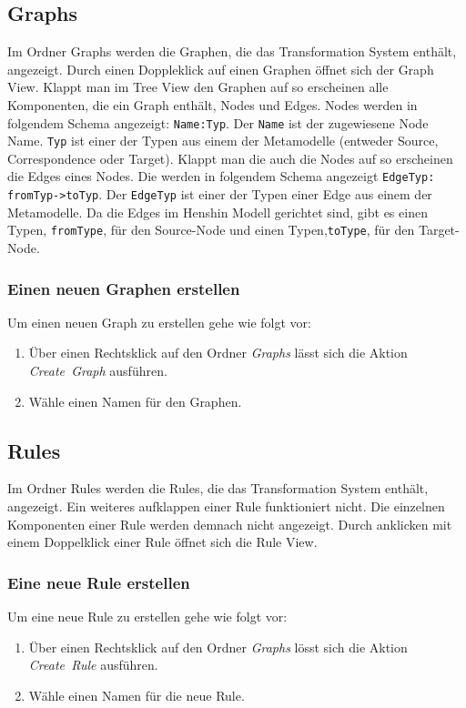 \subsection{Graphs}
Im Ordner Graphs werden die Graphen, die das Transformation System enthält, angezeigt. Durch einen Doppleklick auf einen Graphen öffnet sich der Graph View. Klappt man im Tree View den Graphen auf so erscheinen alle Komponenten, die ein Graph enthält, Nodes und Edges. Nodes werden in folgendem Schema angezeigt: \texttt{Name:Typ}. Der \texttt{Name} ist der zugewiesene Node Name. \texttt{Typ} ist einer der Typen aus einem der Metamodelle (entweder Source, Correspondence oder Target). Klappt man die auch die Nodes auf so erscheinen die Edges eines Nodes. Die werden in folgendem Schema angezeigt \texttt{EdgeTyp: fromTyp->toTyp}. Der \texttt{EdgeTyp} ist einer der Typen einer Edge aus einem der Metamodelle. Da die Edges im Henshin Modell gerichtet sind, gibt es einen Typen, \texttt{fromType}, für den Source-Node und einen Typen,\texttt{toType}, für den Target-Node.

\subsubsection{Einen neuen Graphen erstellen}
Um einen neuen Graph zu erstellen gehe wie folgt vor:
\begin{enumerate}
	\item Über einen Rechtsklick auf den Ordner \textit{Graphs} lässt sich die Aktion \textit{Create\  Graph} ausführen.
	\item Wähle einen Namen für den Graphen.
\end{enumerate}


\subsection{Rules}
Im Ordner Rules werden die Rules, die das Transformation System enthält, angezeigt. Ein weiteres aufklappen einer Rule funktioniert nicht. Die einzelnen Komponenten einer Rule werden demnach nicht angezeigt. Durch anklicken mit einem Doppelklick einer Rule öffnet sich die Rule View.

\subsubsection{Eine neue Rule erstellen}
Um eine neue Rule zu erstellen gehe wie folgt vor:
\begin{enumerate}
	\item Über einen Rechtsklick auf den Ordner \textit{Graphs} lösst sich die Aktion \textit{Create\ Rule} ausführen.
	\item Wähle einen Namen für die neue Rule.
\end{enumerate}

